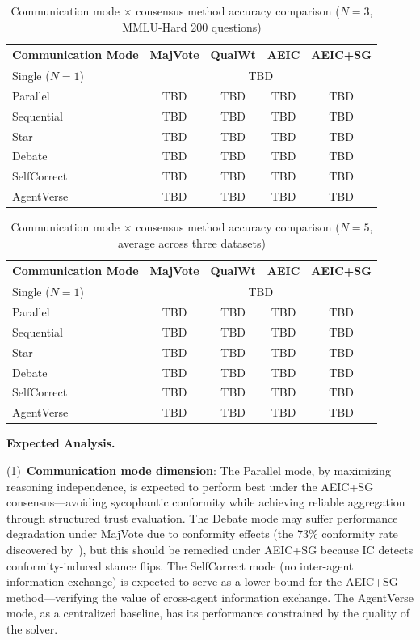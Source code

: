 \documentclass[12pt,a4paper]{article}
\begin{document}
\begin{table}[H]
\centering
\caption{Communication mode $\times$ consensus method accuracy comparison ($N=3$, MMLU-Hard 200 questions)}\label{tab:exp1_mmlu}
\begin{tabular}{lcccc}
\toprule
Communication Mode & MajVote & QualWt & AEIC & AEIC+SG \\
\midrule
Single ($N=1$) & \multicolumn{4}{c}{TBD} \\
Parallel & TBD & TBD & TBD & TBD \\
Sequential & TBD & TBD & TBD & TBD \\
Star & TBD & TBD & TBD & TBD \\
Debate & TBD & TBD & TBD & TBD \\
SelfCorrect & TBD & TBD & TBD & TBD \\
AgentVerse & TBD & TBD & TBD & TBD \\
\bottomrule
\end{tabular}
\end{table}

\begin{table}[H]
\centering
\caption{Communication mode $\times$ consensus method accuracy comparison ($N=5$, average across three datasets)}\label{tab:exp1_5a}
\begin{tabular}{lcccc}
\toprule
Communication Mode & MajVote & QualWt & AEIC & AEIC+SG \\
\midrule
Single ($N=1$) & \multicolumn{4}{c}{TBD} \\
Parallel & TBD & TBD & TBD & TBD \\
Sequential & TBD & TBD & TBD & TBD \\
Star & TBD & TBD & TBD & TBD \\
Debate & TBD & TBD & TBD & TBD \\
SelfCorrect & TBD & TBD & TBD & TBD \\
AgentVerse & TBD & TBD & TBD & TBD \\
\bottomrule
\end{tabular}
\end{table}

\textbf{Expected Analysis.}

(1)~\textbf{Communication mode dimension}: The Parallel mode, by maximizing reasoning independence, is expected to perform best under the AEIC+SG consensus---avoiding sycophantic conformity while achieving reliable aggregation through structured trust evaluation. The Debate mode may suffer performance degradation under MajVote due to conformity effects (the 73\% conformity rate discovered by~\cite{bertalanic2026cost}), but this should be remedied under AEIC+SG because IC detects conformity-induced stance flips. The SelfCorrect mode (no inter-agent information exchange) is expected to serve as a lower bound for the AEIC+SG method---verifying the value of cross-agent information exchange. The AgentVerse mode, as a centralized baseline, has its performance constrained by the quality of the solver.
\end{document}
